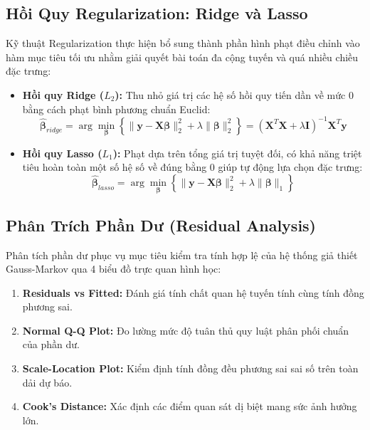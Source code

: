 \documentclass[12pt,a4paper]{report}
\begin{document}
\subsection{Hồi Quy Regularization: Ridge và Lasso}

Kỹ thuật Regularization thực hiện bổ sung thành phần hình phạt điều chỉnh vào hàm mục tiêu tối ưu nhằm giải quyết bài toán đa cộng tuyến và quá nhiều chiều đặc trưng:

\begin{itemize}
    \item \textbf{Hồi quy Ridge ($L_2$):} Thu nhỏ giá trị các hệ số hồi quy tiến dần về mức 0 bằng cách phạt bình phương chuẩn Euclid:
    \begin{equation}
        \hat{\boldsymbol{\beta}}_{ridge} = \arg\min_{\boldsymbol{\beta}} \left\{ \|\mathbf{y} - \mathbf{X}\boldsymbol{\beta}\|_2^2 + \lambda \|\boldsymbol{\beta}\|_2^2 \right\} = (\mathbf{X}^T\mathbf{X} + \lambda \mathbf{I})^{-1}\mathbf{X}^T\mathbf{y}
    \end{equation}
    \item \textbf{Hồi quy Lasso ($L_1$):} Phạt dựa trên tổng giá trị tuyệt đối, có khả năng triệt tiêu hoàn toàn một số hệ số về đúng bằng 0 giúp tự động lựa chọn đặc trưng:
    \begin{equation}
        \hat{\boldsymbol{\beta}}_{lasso} = \arg\min_{\boldsymbol{\beta}} \left\{ \|\mathbf{y} - \mathbf{X}\boldsymbol{\beta}\|_2^2 + \lambda \|\boldsymbol{\beta}\|_1 \right\}
    \end{equation}
\end{itemize}

\subsection{Phân Trích Phần Dư (Residual Analysis)}

Phân tích phần dư phục vụ mục tiêu kiểm tra tính hợp lệ của hệ thống giả thiết Gauss-Markov qua 4 biểu đồ trực quan hình học:
\begin{enumerate}
    \item \textbf{Residuals vs Fitted:} Đánh giá tính chất quan hệ tuyến tính cùng tính đồng phương sai.
    \item \textbf{Normal Q-Q Plot:} Đo lường mức độ tuân thủ quy luật phân phối chuẩn của phần dư.
    \item \textbf{Scale-Location Plot:} Kiểm định tính đồng đều phương sai sai số trên toàn dải dự báo.
    \item \textbf{Cook's Distance:} Xác định các điểm quan sát dị biệt mang sức ảnh hưởng lớn.
\end{enumerate}
\end{document}
